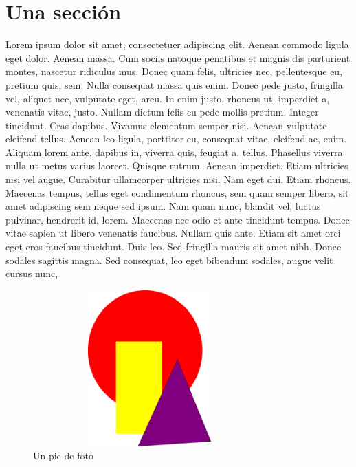 \section{Una sección}

Lorem ipsum dolor sit amet, consectetuer adipiscing elit. Aenean commodo ligula eget dolor. Aenean massa. Cum sociis natoque penatibus et magnis dis parturient montes, nascetur ridiculus mus. Donec quam felis, ultricies nec, pellentesque eu, pretium quis, sem. Nulla consequat massa quis enim. Donec pede justo, fringilla vel, aliquet nec, vulputate eget, arcu. In enim justo, rhoncus ut, imperdiet a, venenatis vitae, justo. Nullam dictum felis eu pede mollis pretium. Integer tincidunt. Cras dapibus. Vivamus elementum semper nisi. Aenean vulputate eleifend tellus. Aenean leo ligula, porttitor eu, consequat vitae, eleifend ac, enim. Aliquam lorem ante, dapibus in, viverra quis, feugiat a, tellus. Phasellus viverra nulla ut metus varius laoreet. Quisque rutrum. Aenean imperdiet. Etiam ultricies nisi vel augue. Curabitur ullamcorper ultricies nisi. Nam eget dui. Etiam rhoncus. Maecenas tempus, tellus eget condimentum rhoncus, sem quam semper libero, sit amet adipiscing sem neque sed ipsum. Nam quam nunc, blandit vel, luctus pulvinar, hendrerit id, lorem. Maecenas nec odio et ante tincidunt tempus. Donec vitae sapien ut libero venenatis faucibus. Nullam quis ante. Etiam sit amet orci eget eros faucibus tincidunt. Duis leo. Sed fringilla mauris sit amet nibh. Donec sodales sagittis magna. Sed consequat, leo eget bibendum sodales, augue velit cursus nunc,

\begin{figure}[!h]
    \centering
    \includegraphics[width=0.8\textwidth,height=6cm]{Imagenes/Arte_abstracto}
    \caption{Un pie de foto}
    \label{fig:una_etiqueta}
\end{figure}







